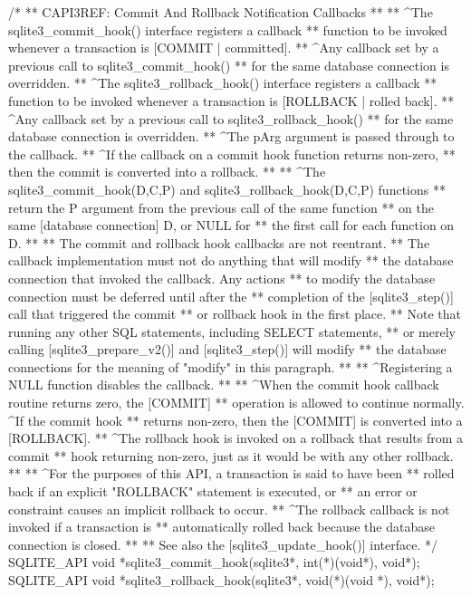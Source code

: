 \begin{Codex}[label=sqlite3.h,numbers=left]
{/*
** CAPI3REF: Commit And Rollback Notification Callbacks
**
** ^The sqlite3_commit_hook() interface registers a callback
** function to be invoked whenever a transaction is [COMMIT | committed].
** ^Any callback set by a previous call to sqlite3_commit_hook()
** for the same database connection is overridden.
** ^The sqlite3_rollback_hook() interface registers a callback
** function to be invoked whenever a transaction is [ROLLBACK | rolled back].
** ^Any callback set by a previous call to sqlite3_rollback_hook()
** for the same database connection is overridden.
** ^The pArg argument is passed through to the callback.
** ^If the callback on a commit hook function returns non-zero,
** then the commit is converted into a rollback.
**
** ^The sqlite3_commit_hook(D,C,P) and sqlite3_rollback_hook(D,C,P) functions
** return the P argument from the previous call of the same function
** on the same [database connection] D, or NULL for
** the first call for each function on D.
**
** The commit and rollback hook callbacks are not reentrant.
** The callback implementation must not do anything that will modify
** the database connection that invoked the callback.  Any actions
** to modify the database connection must be deferred until after the
** completion of the [sqlite3_step()] call that triggered the commit
** or rollback hook in the first place.
** Note that running any other SQL statements, including SELECT statements,
** or merely calling [sqlite3_prepare_v2()] and [sqlite3_step()] will modify
** the database connections for the meaning of "modify" in this paragraph.
**
** ^Registering a NULL function disables the callback.
**
** ^When the commit hook callback routine returns zero, the [COMMIT]
** operation is allowed to continue normally.  ^If the commit hook
** returns non-zero, then the [COMMIT] is converted into a [ROLLBACK].
** ^The rollback hook is invoked on a rollback that results from a commit
** hook returning non-zero, just as it would be with any other rollback.
**
** ^For the purposes of this API, a transaction is said to have been
** rolled back if an explicit "ROLLBACK" statement is executed, or
** an error or constraint causes an implicit rollback to occur.
** ^The rollback callback is not invoked if a transaction is
** automatically rolled back because the database connection is closed.
**
** See also the [sqlite3_update_hook()] interface.
*/
SQLITE_API void *sqlite3_commit_hook(sqlite3*, int(*)(void*), void*);
SQLITE_API void *sqlite3_rollback_hook(sqlite3*, void(*)(void *), void*);

}
\end{Codex}
